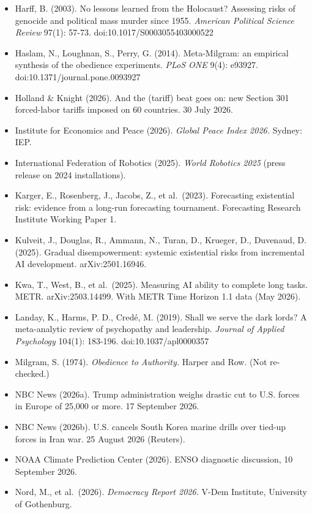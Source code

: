 \documentclass[
  10pt,
]{article}
\begin{document}
\begin{itemize}
\item
  Harff, B. (2003). No lessons learned from the Holocaust? Assessing risks of genocide and political
  mass murder since 1955. \emph{American Political Science Review} 97(1): 57-73.
  doi:10.1017/S0003055403000522
\item
  Haslam, N., Loughnan, S., Perry, G. (2014). Meta-Milgram: an empirical synthesis of the obedience
  experiments. \emph{PLoS ONE} 9(4): e93927. doi:10.1371/journal.pone.0093927
\item
  Holland \& Knight (2026). And the (tariff) beat goes on: new Section 301 forced-labor tariffs
  imposed on 60 countries. 30 July 2026.
\item
  Institute for Economics and Peace (2026). \emph{Global Peace Index 2026.} Sydney: IEP.
\item
  International Federation of Robotics (2025). \emph{World Robotics 2025} (press release on 2024
  installations).
\item
  Karger, E., Rosenberg, J., Jacobs, Z., et al.~(2023). Forecasting existential risk: evidence from
  a long-run forecasting tournament. Forecasting Research Institute Working Paper 1.
\item
  Kulveit, J., Douglas, R., Ammann, N., Turan, D., Krueger, D., Duvenaud, D. (2025). Gradual
  disempowerment: systemic existential risks from incremental AI development. arXiv:2501.16946.
\item
  Kwa, T., West, B., et al.~(2025). Measuring AI ability to complete long tasks. METR.
  arXiv:2503.14499. With METR Time Horizon 1.1 data (May 2026).
\item
  Landay, K., Harms, P. D., Credé, M. (2019). Shall we serve the dark lords? A meta-analytic review
  of psychopathy and leadership. \emph{Journal of Applied Psychology} 104(1): 183-196.
  doi:10.1037/apl0000357
\item
  Milgram, S. (1974). \emph{Obedience to Authority.} Harper and Row. (Not re-checked.)
\item
  NBC News (2026a). Trump administration weighs drastic cut to U.S. forces in Europe of 25,000 or
  more. 17 September 2026.
\item
  NBC News (2026b). U.S. cancels South Korea marine drills over tied-up forces in Iran war. 25
  August 2026 (Reuters).
\item
  NOAA Climate Prediction Center (2026). ENSO diagnostic discussion, 10 September 2026.
\item
  Nord, M., et al.~(2026). \emph{Democracy Report 2026.} V-Dem Institute, University of Gothenburg.

\end{itemize}
\end{document}
